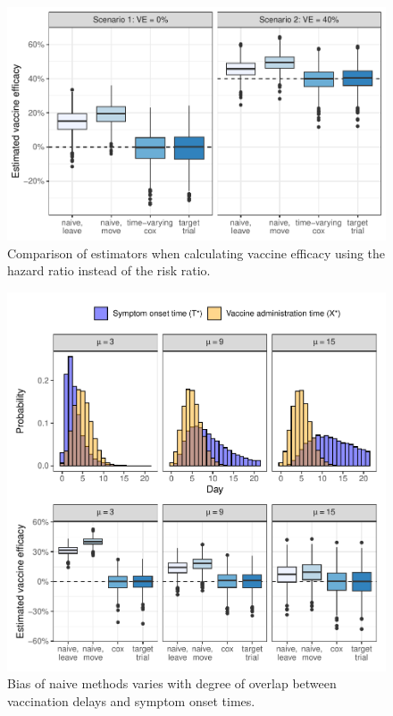 \begin{appendix}
    \begin{figure}[p]
        \centering
        \includegraphics{../3_figures/sim_hr.pdf}
        \caption{Comparison of estimators when calculating vaccine efficacy using the hazard ratio instead of the risk ratio.\label{fig:sim_hr}}
    \end{figure}

    \begin{figure}[p]
        \centering
        \includegraphics{../3_figures/sim_overlap.pdf}
        \caption{Bias of naive methods varies with degree of overlap between vaccination delays and symptom onset times.\label{fig:sim_overlap}}
    \end{figure}


\end{appendix}
